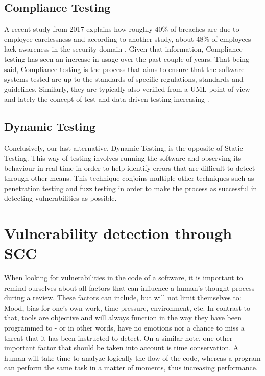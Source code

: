 \subsection{Compliance Testing}
A recent study from 2017 explains how roughly 40\% of breaches are due to employee carelessness \cite{balozian2017review} and according to another study, about 48\% of employees lack awareness in the security domain \cite{coopers2014global}. Given that information, Compliance testing has seen an increase in usage over the past couple of years. That being said, Compliance testing is the process that aims to ensure that the software systems tested are up to the standards of specific regulations, standards and guidelines. Similarly, they are typically also verified from a UML point of view \cite{bunyakiati2009compliance} and lately the concept of test and data-driven testing increasing \cite{steffens2018towards}.

\subsection{Dynamic Testing}
Conclusively, our last alternative, Dynamic Testing, is the opposite of Static Testing. This way of testing involves running the software and observing its behaviour in real-time in order to help identify errors that are difficult to detect through other means. This technique conjoins multiple other techniques such as penetration testing and fuzz testing in order to make the process as successful in detecting vulnerabilities as possible.

\section{Vulnerability detection through SCC}
When looking for vulnerabilities in the code of a software, it is important to remind ourselves about all factors that can influence a human's thought process during a review. These factors can include, but will not limit themselves to: Mood, bias for one's own work, time pressure, environment, etc. In contrast to that, tools are objective and will always function in the way they have been programmed to - or in other words, have no emotions nor a chance to miss a threat that it has been instructed to detect. On a similar note, one other important factor that should be taken into account is time conservation. A human will take time to analyze logically the flow of the code, whereas a program can perform the same task in a matter of moments, thus increasing performance.

